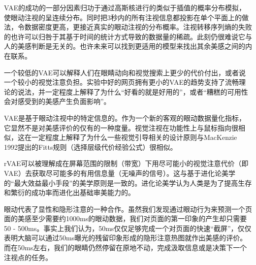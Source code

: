 \documentclass[master, fontset=mac, openany, oneside, zihao=-4]{sjtuthesis}
\begin{document}
VAE的成功的一部分因素归功于通过高斯核进行的类似于插值的概率分布模拟，使眼动注视的呈连续分布。同时把3秒内的所有注视信息都投影在单个平面上的做法，令数据密度更高，更接近真实的眼动注视的分布概率。注视转移序列熵的失败的也许可以归咎于其基于时间的统计方式导致的数据量的稀疏。此刻仍很难说它与人的美感判断是无关的。也许未来可以找到更适用的模型来找出其余美感之间的内在联系。

一个较低的VAE可以解释人们在眼睛动向和视觉搜索上更少的代价付出，或者说一个较小的视觉注意负担。实验中好的网页拥有更小的VAE的趋势支持了流畅理论\cite{Reber2004}的说法，并一定程度上解释了为什么“好看的就是好用的”\cite{Tractinsky2000}，或者“糟糕的可用性会对感受到的美感产生负面影响”\cite{Tuch2012Is}。

VAE是基于眼动注视中的特定信息的。作为一个新的客观的眼动数据量化指标，它显然不是对美感评价的仅有的一种度量。视觉注视在功能性上与鼠标指向很相似，这在一定程度上解释了为什么一些视觉引导相关的设计原则与MacKenzie 1992提出的Fitts规则（选择层级代价经验公式）\cite{MacKenzie1992}很相似。

rVAE可以被理解成在屏幕范围的限制（带宽）下用尽可能小的视觉注意代价（即VAE）去获取尽可能多的有用信息量（无噪声的信号）。这与基于进化论美学\cite{Shimamura2012}的“最大效益最小手段”\cite{Hekkert2006}的美学原则是一致的。进化论美学认为人类是为了提高生存和繁衍的成功率而进化出基础审美能力的。

眼动代表了显性和隐形注意\cite{Goodale1992}的一种合作。虽然我们发现通过眼动行为来预测一个页面的美感至少需要约1000ms的眼动数据，我们对页面的第一印象的产生却只需要50 - 500ms\cite{Lindgaard2006}。事实上我们认为，50ms仅仅足够完成一个对页面的快速“截屏”，仅仅表明大脑可以通过50ms曝光的残留印象形成的隐形注意热图就作出美感的评价。而在50ms左右，我们的眼睛仍然停留在原地不动，完成汲取信息或是决策下一个注视点的任务。

\printbibliography[heading=bibintoc]
\makeatother
\end{document}
